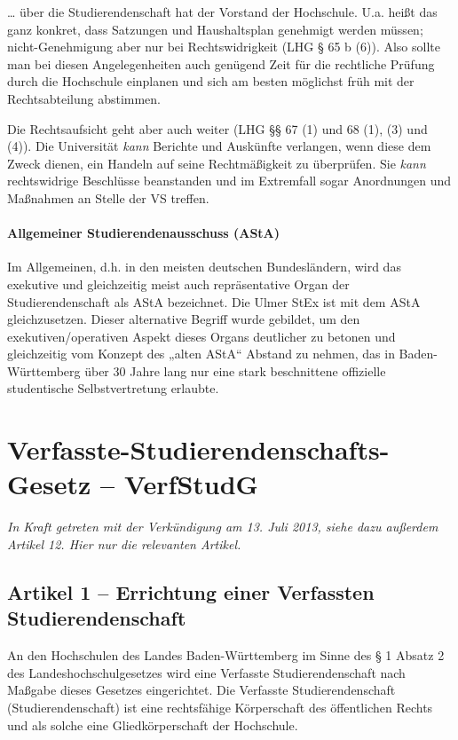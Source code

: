 \documentclass[
10pt,
a4paper,
twoside,								%
titlepage=false,							%
draft=false								%
]{scrartcl}
\begin{document}
… über die Studierendenschaft hat der Vorstand der Hochschule. U.a. heißt das ganz konkret, dass Satzungen und Haushaltsplan genehmigt werden müssen; nicht-Genehmigung aber nur bei Rechtswidrigkeit (LHG § 65 b (6)). Also sollte man bei diesen Angelegenheiten auch genügend Zeit für die rechtliche Prüfung durch die Hochschule einplanen und sich am besten möglichst früh mit der Rechtsabteilung abstimmen.

Die Rechtsaufsicht geht aber auch weiter (LHG §§ 67 (1) und 68 (1), (3) und (4)). Die Universität \emph{kann} Berichte und Auskünfte verlangen, wenn diese dem Zweck dienen, ein Handeln auf seine Rechtmäßigkeit zu überprüfen. Sie \emph{kann} rechtswidrige Beschlüsse beanstanden und im Extremfall sogar Anordnungen und Maßnahmen an Stelle der VS treffen.


\paragraph{Allgemeiner Studierendenausschuss (AStA)}

Im Allgemeinen, d.h. in den meisten deutschen Bundesländern, wird das exekutive und gleichzeitig meist auch repräsentative Organ der Studierendenschaft als AStA bezeichnet. Die Ulmer StEx ist mit dem AStA gleichzusetzen. Dieser alternative Begriff wurde gebildet, um den exekutiven/operativen Aspekt dieses Organs deutlicher zu betonen und gleichzeitig vom Konzept des „alten AStA“ Abstand zu nehmen, das in Baden-Württemberg über 30 Jahre lang nur eine stark beschnittene offizielle studentische Selbstvertretung erlaubte.



\appendix

\newpage
\section{Verfasste-Studierendenschafts-Gesetz – VerfStudG}

\emph{In Kraft getreten mit der Verkündigung am 13. Juli 2013, siehe dazu außerdem Artikel 12. Hier nur die relevanten Artikel.}

\subsection{Artikel 1 – Errichtung einer Verfassten Studierendenschaft}

An den Hochschulen des Landes Baden-Württemberg im Sinne des § 1 Absatz 2 des Landeshochschulgesetzes wird eine Verfasste Studierendenschaft 
nach Maßgabe dieses Gesetzes eingerichtet. Die Verfasste Studierendenschaft (Studierendenschaft) ist eine rechtsfähige Körperschaft des öffentlichen Rechts und als solche eine Gliedkörperschaft der Hochschule.
\end{document}
